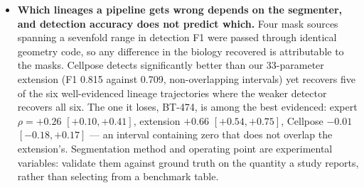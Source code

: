 \begin{itemize}
\item \textbf{Which lineages a pipeline gets wrong depends on the segmenter,
and detection accuracy does not predict which.} Four mask sources spanning a
sevenfold range in detection F1 were passed through identical geometry code,
so any difference in the biology recovered is attributable to the masks.
Cellpose detects significantly better than our 33-parameter extension (F1
0.815 against 0.709, non-overlapping intervals) yet recovers five of the six
well-evidenced lineage trajectories where the weaker detector recovers all
six. The one it loses, BT-474, is among the best evidenced:
expert $\rho = +0.26$ $[+0.10, +0.41]$, extension $+0.66$ $[+0.54, +0.75]$,
Cellpose $-0.01$ $[-0.18, +0.17]$ --- an interval containing zero that does
not overlap the extension's. Segmentation method and operating point are
experimental variables: validate them against ground truth on the quantity a
study reports, rather than selecting from a benchmark table.

\end{itemize}

